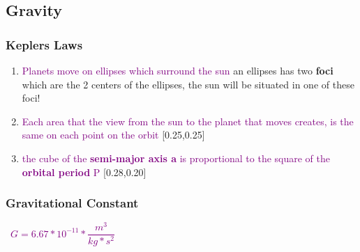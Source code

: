 \documentclass[main.tex,fontsize=8pt,paper=a4,paper=portrait,DIV=calc,]{scrartcl}
\begin{document}
\begin{multicols*}{2}
\subsection{Gravity}
\subsubsection{Keplers Laws}
\begin{enumerate}
\item \textcolor{purple}{Planets move on ellipses which surround the sun}\newline
  an ellipses has two \textbf{foci} which are the 2 centers of the ellipses, the sun will be situated in one of these foci!
\item \textcolor{purple}{Each area that the view from the sun to the planet that moves creates, is the same on each point on the orbit}\newline
  [0.25,0.25]
\item \textcolor{purple}{the cube of the \textbf{semi-major axis a} is proportional to the square of the \textbf{orbital period} P}\newline
  [0.28,0.20]
\end{enumerate} 

\subsubsection{Gravitational Constant}
\, \newline
\large \textcolor{purple}{\( G = 6.67 * 10^{-11}*\dfrac{m^3}{kg * s^2} \)}\newline
\, \newline
\normalsize 



\end{multicols*}
\end{document}
